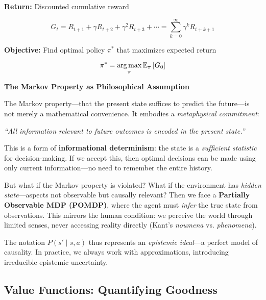 \begin{seanbox}{5.1}
\textbf{Return:} Discounted cumulative reward

\begin{equation}
    G_t = R_{t+1} + \gamma R_{t+2} + \gamma^2 R_{t+3} + \cdots = \sum_{k=0}^{\infty} \gamma^k R_{t+k+1}
\end{equation}

\textbf{Objective:} Find optimal policy $\pi^*$ that maximizes expected return

\begin{equation}
    \pi^* = \operatorname*{arg\,max}_\pi \mathbb{E}_\pi\left[ G_0 \right]
\end{equation}
\end{seanbox}

\begin{philobox}
\textbf{The Markov Property as Philosophical Assumption}

The Markov property---that the present state suffices to predict the future---is not merely a mathematical convenience. It embodies a \textit{metaphysical commitment}:

\begin{center}
\itshape
``All information relevant to future outcomes is encoded in the present state.''
\end{center}

This is a form of \textbf{informational determinism}: the state is a \textit{sufficient statistic} for decision-making. If we accept this, then optimal decisions can be made using only current information---no need to remember the entire history.

But what if the Markov property is violated? What if the environment has \textit{hidden state}---aspects not observable but causally relevant? Then we face a \textbf{Partially Observable MDP (POMDP)}, where the agent must \textit{infer} the true state from observations. This mirrors the human condition: we perceive the world through limited senses, never accessing reality directly (Kant's \textit{noumena} vs. \textit{phenomena}).

The notation $P(s' \mid s, a)$ thus represents an \textit{epistemic ideal}---a perfect model of causality. In practice, we always work with approximations, introducing irreducible epistemic uncertainty.
\end{philobox}

\subsection{Value Functions: Quantifying Goodness}

